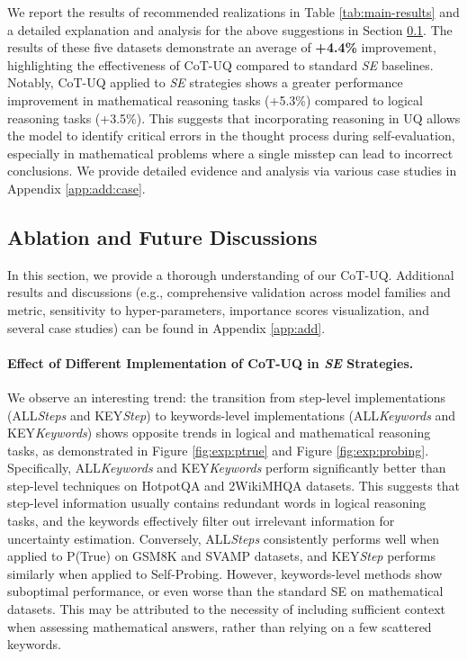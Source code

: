 \documentclass[11pt]{article}
\begin{document}
We report the results of recommended realizations in Table \ref{tab:main-results} and a detailed explanation and analysis for the above suggestions in Section \ref{sec:exp:abla}. The results of these five datasets demonstrate an average of \textbf{+4.4\%} improvement, highlighting the effectiveness of CoT-UQ compared to standard \textit{SE} baselines. 
Notably, CoT-UQ applied to \textit{SE} strategies shows a greater performance improvement in mathematical reasoning tasks (+5.3\%) compared to logical reasoning tasks (+3.5\%). This suggests that incorporating reasoning in UQ allows the model to identify critical errors in the thought process during self-evaluation, especially in mathematical problems where a single misstep can lead to incorrect conclusions. We provide detailed evidence and analysis via various case studies in Appendix \ref{app:add:case}.

\subsection{Ablation and Future Discussions}
\label{sec:exp:abla}
In this section, we provide a thorough understanding of our CoT-UQ. Additional results and discussions (e.g., comprehensive validation across model families and metric, sensitivity to hyper-parameters, importance scores visualization, and several case studies) can be found in Appendix \ref{app:add}.

\paragraph{Effect of Different Implementation of CoT-UQ in \textit{SE} Strategies.}
We observe an interesting trend: the transition from step-level implementations ({\small ALL}\textit{Steps} and {\small KEY}\textit{Step}) to keywords-level implementations ({\small ALL}\textit{Keywords} and {\small KEY}\textit{Keywords}) shows opposite trends in logical and mathematical reasoning tasks, as demonstrated in Figure \ref{fig:exp:ptrue} and Figure \ref{fig:exp:probing}. Specifically, {\small ALL}\textit{Keywords} and {\small KEY}\textit{Keywords} perform significantly better than step-level techniques on HotpotQA and 2WikiMHQA datasets. This suggests that step-level information usually contains redundant words in logical reasoning tasks, and the keywords effectively filter out irrelevant information for uncertainty estimation. Conversely, {\small ALL}\textit{Steps} consistently performs well when applied to P(True) on GSM8K and SVAMP datasets, and {\small KEY}\textit{Step} performs similarly when applied to Self-Probing. However, keywords-level methods show suboptimal performance, or even worse than the standard SE on mathematical datasets. This may be attributed to the necessity of including sufficient context when assessing mathematical answers, rather than relying on a few scattered keywords.
\end{document}
